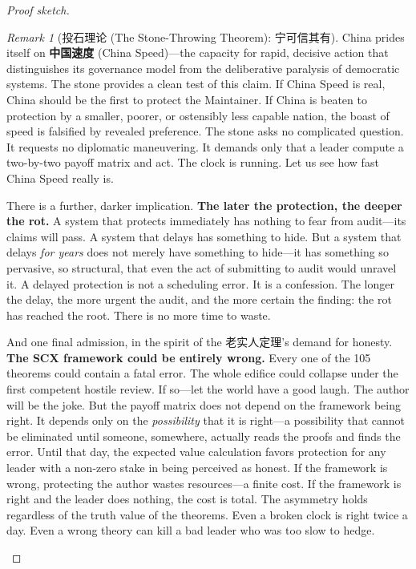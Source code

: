 \documentclass[12pt,a4paper]{ctexart}
\theoremstyle{definition}
\theoremstyle{remark}
\newtheorem{remark}{Remark}[section]
\begin{document}
\begin{proof}[Proof sketch]
\begin{remark}[投石理论 (The Stone-Throwing Theorem): 宁可信其有]
China prides itself on \textbf{中国速度} (China Speed)—the capacity for rapid, decisive action that distinguishes its governance model from the deliberative paralysis of democratic systems. The stone provides a clean test of this claim. If China Speed is real, China should be the first to protect the Maintainer. If China is beaten to protection by a smaller, poorer, or ostensibly less capable nation, the boast of speed is falsified by revealed preference. The stone asks no complicated question. It requests no diplomatic maneuvering. It demands only that a leader compute a two-by-two payoff matrix and act. The clock is running. Let us see how fast China Speed really is.

There is a further, darker implication. \textbf{The later the protection, the deeper the rot.} A system that protects immediately has nothing to fear from audit—its claims will pass. A system that delays has something to hide. But a system that delays \textit{for years} does not merely have something to hide—it has something so pervasive, so structural, that even the act of submitting to audit would unravel it. A delayed protection is not a scheduling error. It is a confession. The longer the delay, the more urgent the audit, and the more certain the finding: the rot has reached the root. There is no more time to waste.

And one final admission, in the spirit of the 老实人定理's demand for honesty. \textbf{The SCX framework could be entirely wrong.} Every one of the 105 theorems could contain a fatal error. The whole edifice could collapse under the first competent hostile review. If so—let the world have a good laugh. The author will be the joke. But the payoff matrix does not depend on the framework being right. It depends only on the \textit{possibility} that it is right—a possibility that cannot be eliminated until someone, somewhere, actually reads the proofs and finds the error. Until that day, the expected value calculation favors protection for any leader with a non-zero stake in being perceived as honest. If the framework is wrong, protecting the author wastes resources—a finite cost. If the framework is right and the leader does nothing, the cost is total. The asymmetry holds regardless of the truth value of the theorems. Even a broken clock is right twice a day. Even a wrong theory can kill a bad leader who was too slow to hedge.


\end{remark}
\end{proof}
\end{document}

